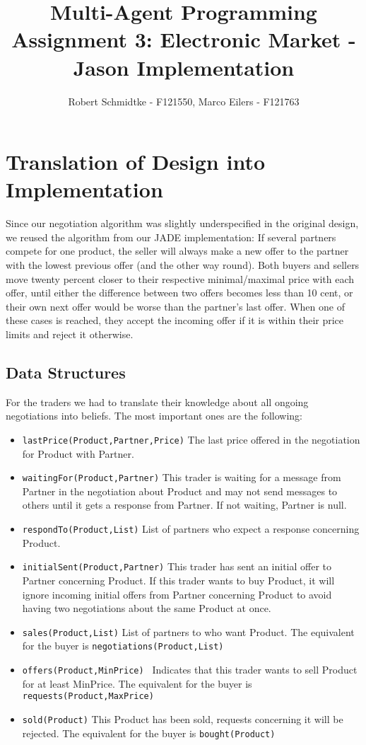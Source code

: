 \documentclass[a4paper,11pt]{article}
\begin{document}
\title{Multi-Agent Programming\\Assignment 3: Electronic Market - Jason Implementation}
\author{Robert Schmidtke - F121550, Marco Eilers - F121763}

\maketitle
\newpage

\section{Translation of Design into Implementation}
Since our negotiation algorithm was slightly underspecified in the original design, we reused the algorithm from our JADE implementation: If several partners compete for one product, the seller will always make a new offer to the partner with the lowest previous offer (and the other way round). Both buyers and sellers move twenty percent closer to their respective minimal/maximal price with each offer, until either the difference between two offers becomes less than 10 cent, or their own next offer would be worse than the partner's last offer. When one of these cases is reached, they accept the incoming offer if it is within their price limits and reject it otherwise.

\subsection{Data Structures}
For the traders we had to translate their knowledge about all ongoing negotiations into beliefs. The most important ones are the following:
\begin{itemize}
  \item \texttt{lastPrice(Product,Partner,Price)} The last price offered in the negotiation for
Product with Partner.
  \item \texttt{waitingFor(Product,Partner)} This trader is waiting for a message from Partner 
in the negotiation about Product and may not send messages to others until it
gets a response from Partner. If not waiting, Partner is null.
 \item \texttt{respondTo(Product,List)} List of partners who expect a response concerning 
Product.
\item \texttt{initialSent(Product,Partner)} This trader has sent an initial offer to Partner
concerning Product. If this trader wants to buy Product, it will ignore incoming 
initial offers from Partner concerning Product to avoid having two negotiations 
about the same Product at once.
\item \texttt{sales(Product,List)} List of partners to who want Product. The equivalent for the buyer is \texttt{negotiations(Product,List)}
\item \texttt{offers(Product,MinPrice) } Indicates that this trader wants to sell Product for
at least MinPrice. The equivalent for the buyer is \texttt{requests(Product,MaxPrice)}
\item \texttt{sold(Product)} This Product has been sold, requests concerning it will be
rejected. The equivalent for the buyer is \texttt{bought(Product)}
\end{itemize}
\end{document}
